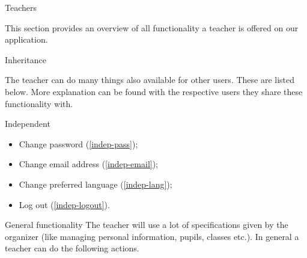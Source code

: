 
\begin{section}{Teachers}

    This section provides an overview of all functionality a teacher is offered
    on our application.

    \begin{subsection}{Inheritance}

        The teacher can do many things also available for other users. These are
        listed below. More explanation can be found with the respective users
        they share these functionality with.

        \begin{subsubsection}{Independent}

            \begin{itemize}
                \item Change password           (\ref{indep-pass});
                \item Change email address     (\ref{indep-email});
                \item Change preferred language (\ref{indep-lang});
                \item Log out                   (\ref{indep-logout}).
            \end{itemize}

        \end{subsubsection}

    \end{subsection}

    \begin{subsection}{General functionality}
	The teacher will use a lot of specifications given by the organizer (like managing personal information, pupils, classes etc.). In general a teacher can do the following actions.\\


\end{subsection}
\end{section}
